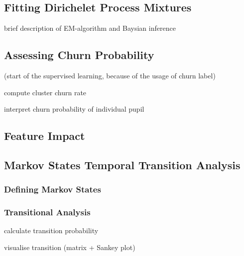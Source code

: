 \subsection{Fitting Dirichelet Process Mixtures}

brief description of EM-algorithm and Baysian inference

\subsection{Assessing Churn Probability}

(start of the supervised learning, because of the usage of churn label)

compute cluster churn rate

interpret churn probability of individual pupil

\subsection{Feature Impact}

\subsection{Markov States Temporal Transition Analysis}

\subsubsection{Defining Markov States}

\subsubsection{Transitional Analysis}

calculate transition probability

visualise transition (matrix + Sankey plot) \cite{hmm2015}